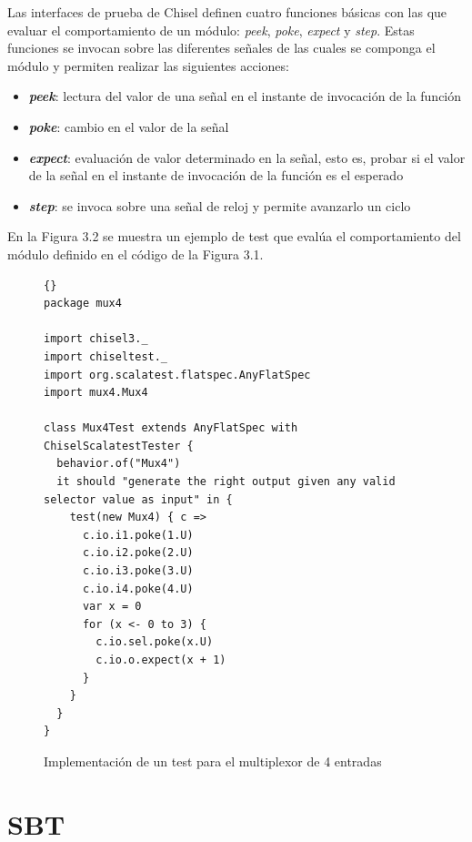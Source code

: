Las interfaces de prueba de Chisel definen cuatro funciones básicas con las que evaluar el comportamiento de un módulo: \textit{peek}, \textit{poke},  \textit{expect} y \textit{step}. Estas funciones se invocan sobre las diferentes señales de las cuales se componga el módulo y permiten realizar las siguientes acciones:

\begin{itemize}
  \item \textbf{\textit{peek}}: lectura del valor de una señal en el instante de invocación de la función
  \vspace{-0.2cm}
  \item \textbf{\textit{poke}}: cambio en el valor de la señal
  \vspace{-0.2cm}
  \item \textbf{\textit{expect}}: evaluación de valor determinado en la señal, esto es, probar si el valor de la señal en el instante de invocación de la función es el esperado
  \vspace{-0.2cm}
  \item \textbf{\textit{step}}: se invoca sobre una señal de reloj y permite avanzarlo un ciclo
\end{itemize}

En la Figura 3.2 se muestra un ejemplo de test que evalúa el comportamiento del módulo definido en el código de la Figura 3.1.

\begin{figure}
\begin{lstlisting}[style=scalaStyle]{}
package mux4

import chisel3._
import chiseltest._
import org.scalatest.flatspec.AnyFlatSpec
import mux4.Mux4

class Mux4Test extends AnyFlatSpec with ChiselScalatestTester {
  behavior.of("Mux4")
  it should "generate the right output given any valid selector value as input" in {
    test(new Mux4) { c =>
      c.io.i1.poke(1.U)
      c.io.i2.poke(2.U)
      c.io.i3.poke(3.U)
      c.io.i4.poke(4.U)
      var x = 0
      for (x <- 0 to 3) {
        c.io.sel.poke(x.U)
        c.io.o.expect(x + 1)
      }
    }
  }
}
\end{lstlisting}
\caption{Implementación de un test para el multiplexor de 4 entradas}
\end{figure}


\section{SBT}

